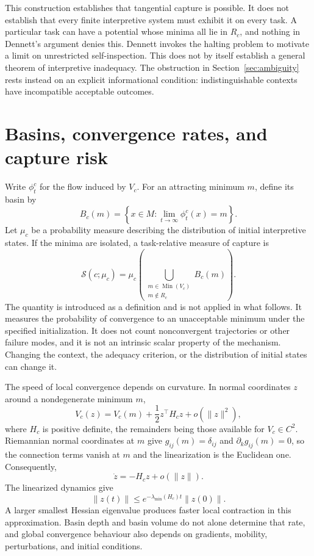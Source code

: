 \documentclass[11pt]{article}
\begin{document}
This construction establishes that tangential capture is possible. It does not establish that every finite interpretive system must exhibit it on every task. A particular task can have a potential whose minima all lie in $R_c$, and nothing in Dennett's argument denies this. Dennett invokes the halting problem to motivate a limit on unrestricted self-inspection. This does not by itself establish a general theorem of interpretive inadequacy. The obstruction in Section~\ref{sec:ambiguity} rests instead on an explicit informational condition: indistinguishable contexts have incompatible acceptable outcomes.

\section{Basins, convergence rates, and capture risk}

Write $\phi_t^c$ for the flow induced by $V_c$. For an attracting minimum $m$, define its basin by
\[
B_c(m)
=
\left\{
x\in M:
\lim_{t\to\infty}\phi_t^c(x)=m
\right\}.
\]
Let $\mu_c$ be a probability measure describing the distribution of initial interpretive states. If the minima are isolated, a task-relative measure of capture is
\[
\mathcal{S}(c;\mu_c)
=
\mu_c\left(
\bigcup_{\substack{m\in\operatorname{Min}(V_c)\\m\notin R_c}}
B_c(m)
\right).
\]
The quantity is introduced as a definition and is not applied in what follows. It measures the probability of convergence to an unacceptable minimum under the specified initialization. It does not count nonconvergent trajectories or other failure modes, and it is not an intrinsic scalar property of the mechanism. Changing the context, the adequacy criterion, or the distribution of initial states can change it.

The speed of local convergence depends on curvature. In normal coordinates $z$ around a nondegenerate minimum $m$,
\[
V_c(z)
=
V_c(m)+\frac12 z^\top H_c z+o(\|z\|^2),
\]
where $H_c$ is positive definite, the remainders being those available for $V_c\in C^2$. Riemannian normal coordinates at $m$ give $g_{ij}(m)=\delta_{ij}$ and $\partial_kg_{ij}(m)=0$, so the connection terms vanish at $m$ and the linearization is the Euclidean one. Consequently,
\[
\dot{z}=-H_cz+o(\|z\|).
\]
The linearized dynamics give
\[
\|z(t)\|
\leq
e^{-\lambda_{\min}(H_c)t}\|z(0)\|.
\]
A larger smallest Hessian eigenvalue produces faster local contraction in this approximation. Basin depth and basin volume do not alone determine that rate, and global convergence behaviour also depends on gradients, mobility, perturbations, and initial conditions.
\end{document}
